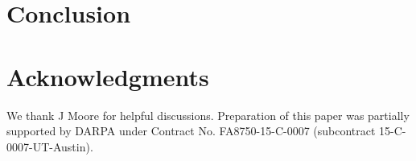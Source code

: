 \documentclass[submission,copyright,creativecommons]{eptcs}
\begin{document}
\section{Conclusion}
\label{sec:conclusion}


\section*{Acknowledgments}

We thank J Moore for helpful discussions.
Preparation of this paper was partially supported by DARPA under
Contract No. FA8750-15-C-0007 (subcontract 15-C-0007-UT-Austin).



\end{document}
